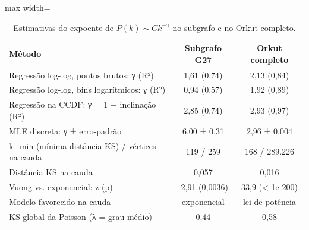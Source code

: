 \begin{table}[!htb]
\centering
\caption{Estimativas do expoente de $P(k) \sim C k^{-\gamma}$ no subgrafo e no Orkut completo.}
\label{tab:powerlaw}
\begin{adjustbox}{max width=\linewidth}
\begin{tabular}{lcc}
\toprule
Método & Subgrafo G27 & Orkut completo \\
\midrule
Regressão log-log, pontos brutos: γ (R²) & 1,61 (0,74) & 2,13 (0,84) \\
Regressão log-log, bins logarítmicos: γ (R²) & 0,94 (0,57) & 1,92 (0,89) \\
Regressão na CCDF: γ = 1 − inclinação (R²) & 2,85 (0,74) & 2,93 (0,97) \\
MLE discreta: γ ± erro-padrão & 6,00 ± 0,31 & 2,96 ± 0,004 \\
k\_min (mínima distância KS) / vértices na cauda & 119 / 259 & 168 / 289.226 \\
Distância KS na cauda & 0,057 & 0,016 \\
Vuong vs. exponencial: z (p) & -2,91 (0,0036) & 33,9 (< 1e-200) \\
Modelo favorecido na cauda & exponencial & lei de potência \\
KS global da Poisson (λ = grau médio) & 0,44 & 0,58 \\
\bottomrule
\end{tabular}
\end{adjustbox}
\end{table}

